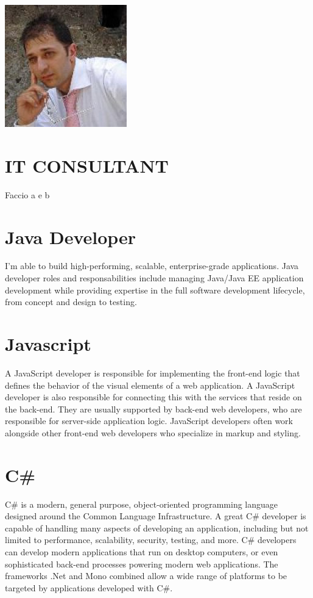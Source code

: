 \documentclass{article}
\begin{document}
	

		\includegraphics{profile.jpg}
			
		\section*{IT CONSULTANT}
		Faccio a e b		

		\section*{Java Developer}
		I'm able to build high-performing, scalable, enterprise-grade applications.
		Java developer roles and responsabilities include managing Java/Java EE application development while providing expertise in the full software development lifecycle, from concept and design to testing.
		
		\section*{Javascript}
		A JavaScript developer is responsible for implementing the front-end logic that defines the behavior of the visual elements of a web application. A JavaScript developer is also responsible for connecting this with the services that reside on the back-end. They are usually supported by back-end web developers, who are responsible for server-side application logic. JavaScript developers often work alongside other front-end web developers who specialize in markup and styling.
	
		\section*{C\#}
		C\# is a modern, general purpose, object-oriented programming language designed around the Common Language Infrastructure. A great C\# developer is capable of handling many aspects of developing an application, including but not limited to performance, scalability, security, testing, and more. C\# developers can develop modern applications that run on desktop computers, or even sophisticated back-end processes powering modern web applications. The frameworks .Net and Mono combined allow a wide range of platforms to be targeted by applications developed with C\#.		
\end{document}

